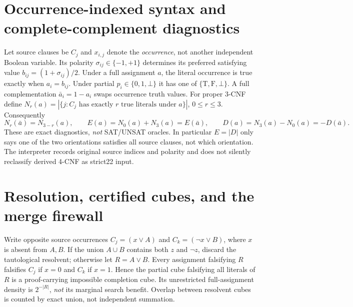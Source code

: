\documentclass[10pt]{article}
\begin{document}
\section{Occurrence-indexed syntax and complete-complement diagnostics}
Let source clauses be $C_j$ and $x_{i,j}$ denote the \emph{occurrence}, not another independent Boolean variable. Its polarity $\sigma_{ij}\in\{-1,+1\}$ determines its preferred satisfying value $b_{ij}=(1+\sigma_{ij})/2$. Under a full assignment $a$, the literal occurrence is true exactly when $a_i=b_{ij}$. Under partial $p_i\in\{0,1,\bot\}$ it has one of $\{\mathrm{T},\mathrm{F},\bot\}$. A full complementation $\bar a_i=1-a_i$ swaps occurrence truth values.
For proper 3-CNF define $N_r(a)=|\{j:C_j\text{ has exactly }r\text{ true literals under }a\}|$, $0\le r\le3$. Consequently
\[
 N_r(\bar a)=N_{3-r}(a),\qquad E(a)=N_0(a)+N_3(a)=E(\bar a),\qquad D(a)=N_3(a)-N_0(a)=-D(\bar a).
\]
These are exact diagnostics, \emph{not} SAT/UNSAT oracles. In particular $E=|D|$ only says one of the two orientations satisfies all source clauses, not which orientation. The interpreter records original source indices and polarity and does not silently reclassify derived 4-CNF as strict22 input.

\section{Resolution, certified cubes, and the merge firewall}
Write opposite source occurrences $C_j=(x\lor A)$ and $C_k=(\neg x\lor B)$, where $x$ is absent from $A,B$. If the union $A\cup B$ contains both $z$ and $\neg z$, discard the tautological resolvent; otherwise let $R=A\lor B$. Every assignment falsifying $R$ falsifies $C_j$ if $x=0$ and $C_k$ if $x=1$. Hence the partial cube falsifying all literals of $R$ is a proof-carrying impossible completion cube. Its unrestricted full-assignment density is $2^{-|R|}$, \emph{not} its marginal search benefit. Overlap between resolvent cubes is counted by exact union, not independent summation.
\end{document}
